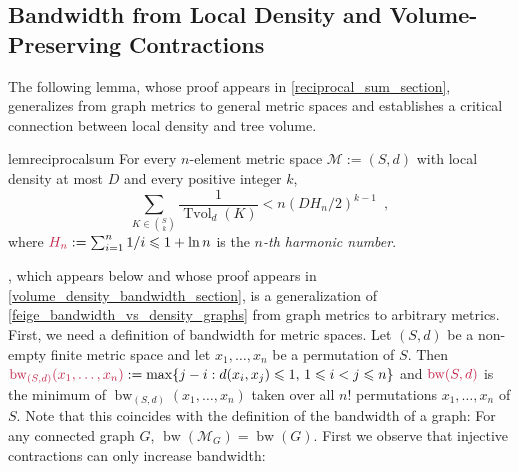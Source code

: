\documentclass{patmorin}
\makeatletter
\renewcommand{\le}{\leqslant}
\newcommand{\defin}[1]{\emph{\textcolor{brightmaroon}{#1}}}
\def\mathcolor#1#{\@mathcolor{#1}}
\def\@mathcolor#1#2#3{%
  \protect\leavevmode
  \begingroup
    \color#1{#2}#3%
  \endgroup
}
\newcommand{\mathdefin}[1]{\mathcolor{brightmaroon}{#1}}
\DeclareMathOperator{\bw}{bw}
\DeclareMathOperator{\tvol}{Tvol}
\makeatother
\begin{document}
\subsection{Bandwidth from Local Density and Volume-Preserving Contractions}

The following lemma, whose proof appears in \cref{reciprocal_sum_section}, generalizes \citet[Theorem~10]{feige:approximating} from graph metrics to general metric spaces and establishes a critical connection between local density and tree volume.

\begin{restatable}{lem}{reciprocalsum}\label{reciprocal_sum}
  For every $n$-element metric space $\mathcal{M}:=(S,d)$ with local density at most $D$ and every positive integer $k$,
  \[
    \sum_{K\in \binom{S}{k}}\frac{1}{\tvol_{d}(K)} < n(DH_n/2)^{k-1} \enspace ,
  \]
  where $\mathdefin{H_n}:=\sum_{i=1}^n 1/i\le 1+\ln n$ is the \defin{$n$-th harmonic number}.
\end{restatable}



, which appears below and whose proof appears in
\cref{volume_density_bandwidth_section}, is a generalization of \cref{feige_bandwidth_vs_density_graphs} from graph metrics to arbitrary metrics.
First, we need a definition of bandwidth for metric spaces.  Let $(S,d)$ be a non-empty finite metric space and let $x_1,\ldots,x_n$ be a permutation of $S$.  Then $\mathdefin{\bw_{(S,d)}(x_1,\ldots,x_n)}:=\max\{j-i:d(x_i,x_j)\le 1,\, 1\le i <j\le n\}$ and $\mathdefin{\bw(S,d)}$ is the minimum of $\bw_{(S,d)}(x_1,\ldots,x_n)$ taken over all $n!$ permutations $x_1,\ldots,x_n$ of $S$.  Note that this coincides with the definition of the bandwidth of a graph: For any connected graph $G$, $\bw(\mathcal{M}_G)=\bw(G)$.  First we observe that injective
contractions can only increase bandwidth:
\end{document}
